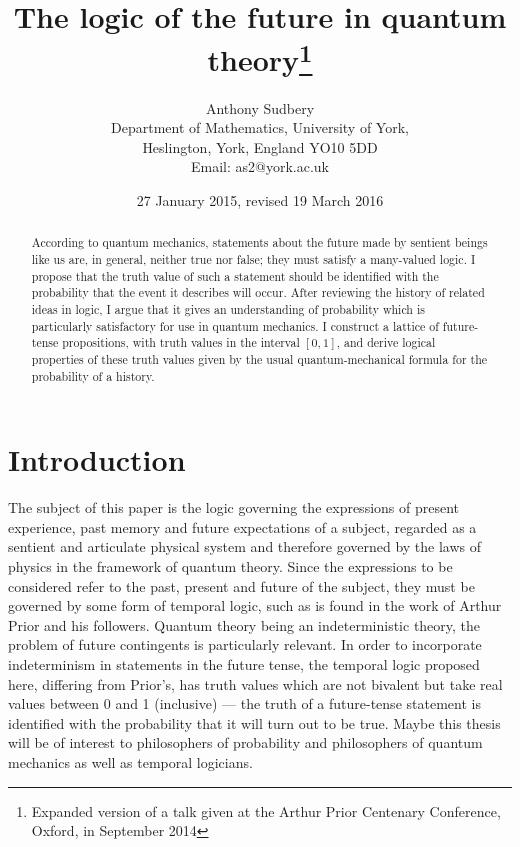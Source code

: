 \documentclass[12pt,a4paper,reqno]{article}
\renewcommand{\(}{\left(}
\renewcommand{\)}{\right)}
\newcommand{\<}{\langle}
\renewcommand{\>}{\rangle}
\theoremstyle{plain} %
\begin{document}
\title{The logic of the future in quantum theory\footnote{Expanded version of a talk given at the Arthur Prior Centenary Conference, Oxford, in September 2014}}



\author{Anthony Sudbery\\[10pt] \small Department of Mathematics,
    University of York,\\[-2pt] \small Heslington, York, England YO10 5DD\\ 
    \small  Email:  as2@york.ac.uk}
\date{27 January 2015, revised 19 March 2016}





\maketitle



\begin{abstract}
According to quantum mechanics, statements about the future made by sentient beings like us are, in general, neither true nor false; they must satisfy a many-valued logic. I propose that the truth value of such a statement should be identified with the probability that the event it describes will occur. After reviewing the history of related ideas in logic, I argue that it gives an understanding of probability which is particularly satisfactory for use in quantum mechanics. I construct a lattice of 
future-tense propositions, with truth values in the interval $[0,1]$, and derive logical properties of these truth values given by the usual quantum-mechanical formula for the probability of a history.  
\end{abstract}
 
\section{Introduction}
\label{intro}

The subject of this paper is the logic governing the expressions of present experience, past memory and future expectations of a subject, regarded as a sentient and articulate physical system and therefore governed by the laws of physics in the framework of quantum theory. Since the expressions to be considered refer to the past, present and future of the subject, they must be governed by some form of temporal logic, such as is found in the work of Arthur Prior and his followers. Quantum theory being an indeterministic theory, the problem of future contingents is particularly relevant. In order to incorporate indeterminism in statements in the future tense, the temporal logic proposed here, differing from Prior's, has truth values which are not bivalent but take real values between 0 and 1 (inclusive) --- the truth of a future-tense statement is identified with the probability that it will turn out to be true.  Maybe this thesis will be of interest to philosophers of probability and philosophers of quantum mechanics as well as temporal logicians.
\end{document}
